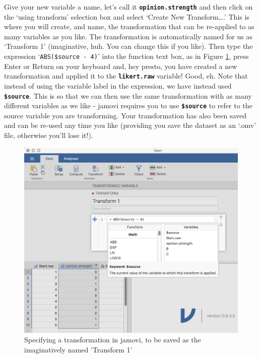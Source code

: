 \documentclass[
]{book}
\begin{document}
Give your new variable a name, let's call it \textbf{\texttt{opinion.strength}} and then click on the `using transform' selection box and select `Create New Transform\ldots{}.' This is where you will create, and name, the transformation that can be re-applied to as many variables as you like. The transformation is automatically named for us as `Transform 1' (imaginative, huh. You can change this if you like). Then type the expression `\texttt{ABS(\$source\ -\ 4)}' into the function text box, as in Figure \ref{fig:transform2}, press Enter or Return on your keyboard and, hey presto, you have created a new transformation and applied it to the \textbf{\texttt{likert.raw}} variable! Good, eh. Note that instead of using the variable label in the expression, we have instead used \textbf{\texttt{\$source}}. This is so that we can then use the same transformation with as many different variables as we like - jamovi requires you to use \textbf{\texttt{\$source}} to refer to the source variable you are transforming. Your transformation has also been saved and can be re-used any time you like (providing you save the dataset as an `.omv' file, otherwise you'll lose it!).

\begin{figure}

{\centering \includegraphics[width=1\linewidth]{img/mechanics/transform2} 

}

\caption{Specifying a transformation in jamovi, to be saved as the imaginatively named 'Transform 1'}\label{fig:transform2}
\end{figure}
\end{document}
